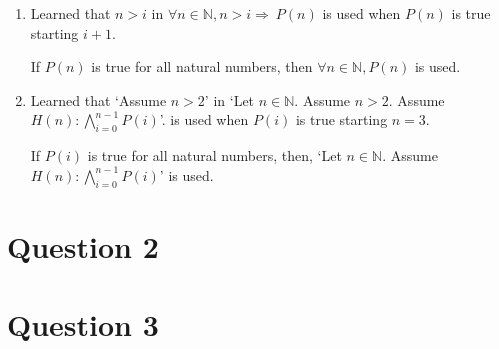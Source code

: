 \documentclass[12pt]{article}
\begin{document}
\begin{enumerate}[1.]
    \item Learned that $n > i$ in $\forall n \in \mathbb{N}, n > i \Rightarrow \:P(n)$
    is used when $P(n)$ is true starting $i + 1$.

    \bigskip

    If $P(n)$ is true for all natural numbers, then $\forall n \in \mathbb{N}, P(n)$
    is used.

    \item Learned that `Assume $n > 2$' in `Let $n \in \mathbb{N}$. Assume $n > 2$.
    Assume $H(n):\bigwedge\limits_{i=0}^{n-1} P(i)$'. is used
    when $P(i)$ is true starting $n = 3$.

    \bigskip

    If $P(i)$ is true for all natural numbers, then, `Let $n \in \mathbb{N}$. Assume
    $H(n):\bigwedge\limits_{i=0}^{n-1} P(i)$' is used.

\end{enumerate}

\section*{Question 2}

\section*{Question 3}
\end{document}
